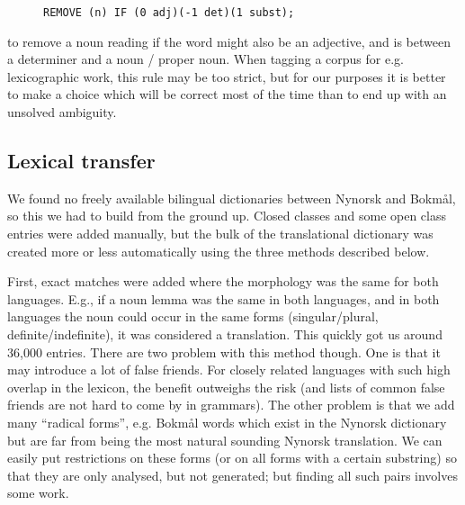 \documentclass[11pt]{article}
\newcommand{\comment}[1]{\textbf{SKRIV} {\it #1}}
\renewcommand{\comment}[1]{}
\begin{document}
\begin{figure}[htp] {\tt \small  REMOVE (n) IF (0 adj)(-1 det)(1 subst);}
\end{figure}

to remove a noun reading if the word might also be an adjective,
and is between a determiner and a noun / proper noun. When tagging a
corpus for e.g. lexicographic work, this rule may be too strict, but
for our purposes it is better to make a choice which will be correct
most of the time than to end up with an unsolved ambiguity.

\comment{Hmm, actually, a better example might be the gjør=>gøyr vs
  gjer disambiguation, where we only choose `barks' if there's a dog
  in the sentence.}

\subsection{Lexical transfer}

We found no freely available bilingual dictionaries
between Nynorsk and Bokmål, so this we had to build from the ground
up. Closed classes and some open class entries were added
manually, but the bulk of the translational dictionary was created
more or less automatically using the three methods described below.

First, exact matches were added where the morphology was the same for
both languages. E.g., if a noun lemma was the same in both languages,
and in both languages the noun could occur in the same forms
(singular/plural, definite/indefinite), it was considered a
translation. This quickly got us around 36,000 entries. There are two
problem with this method though. One is that it may introduce a lot of
false friends. For closely related languages with such high
overlap in the lexicon, the benefit outweighs the risk (and lists of
common false friends are not hard to come by in grammars). The other
problem is that we add many ``radical forms'', e.g. Bokmål words which
exist in the Nynorsk dictionary but are far from being the most
natural sounding Nynorsk translation. We can easily put restrictions
on these forms (or on all forms with a certain substring) so that they
are only analysed, but not generated; but finding all such pairs
involves some work.
\end{document}
